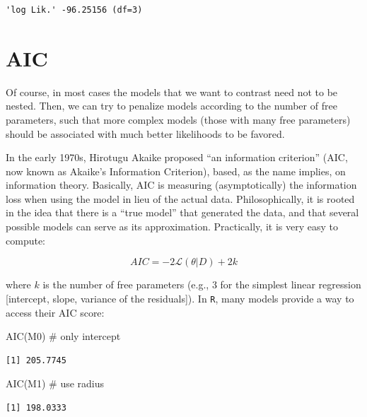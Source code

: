 \documentclass[
  letterpaper,
  DIV=11,
  numbers=noendperiod]{scrreprt}
\newenvironment{Shaded}{\begin{snugshade}}{\end{snugshade}}
\newcommand{\CommentTok}[1]{\textcolor[rgb]{0.37,0.37,0.37}{#1}}
\newcommand{\FunctionTok}[1]{\textcolor[rgb]{0.28,0.35,0.67}{#1}}
\newcommand{\NormalTok}[1]{\textcolor[rgb]{0.00,0.23,0.31}{#1}}
\begin{document}
\begin{verbatim}
'log Lik.' -96.25156 (df=3)
\end{verbatim}

\hypertarget{aic}{%
\section{AIC}\label{aic}}

Of course, in most cases the models that we want to contrast need not to
be nested. Then, we can try to penalize models according to the number
of free parameters, such that more complex models (those with many free
parameters) should be associated with much better likelihoods to be
favored.

In the early 1970s, Hirotugu Akaike proposed ``an information
criterion'' (AIC, now known as Akaike's Information Criterion), based,
as the name implies, on information theory. Basically, AIC is measuring
(asymptotically) the information loss when using the model in lieu of
the actual data. Philosophically, it is rooted in the idea that there is
a ``true model'' that generated the data, and that several possible
models can serve as its approximation. Practically, it is very easy to
compute:

\[AIC = -2 \mathcal L(\theta \vert D) + 2 k\]

where \(k\) is the number of free parameters (e.g., 3 for the simplest
linear regression {[}intercept, slope, variance of the residuals{]}). In
\texttt{R}, many models provide a way to access their AIC score:

\begin{Shaded}
\begin{Highlighting}[]
\FunctionTok{AIC}\NormalTok{(M0) }\CommentTok{\# only intercept}
\end{Highlighting}
\end{Shaded}

\begin{verbatim}
[1] 205.7745
\end{verbatim}

\begin{Shaded}
\begin{Highlighting}[]
\FunctionTok{AIC}\NormalTok{(M1) }\CommentTok{\# use radius}
\end{Highlighting}
\end{Shaded}

\begin{verbatim}
[1] 198.0333
\end{verbatim}
\end{document}
